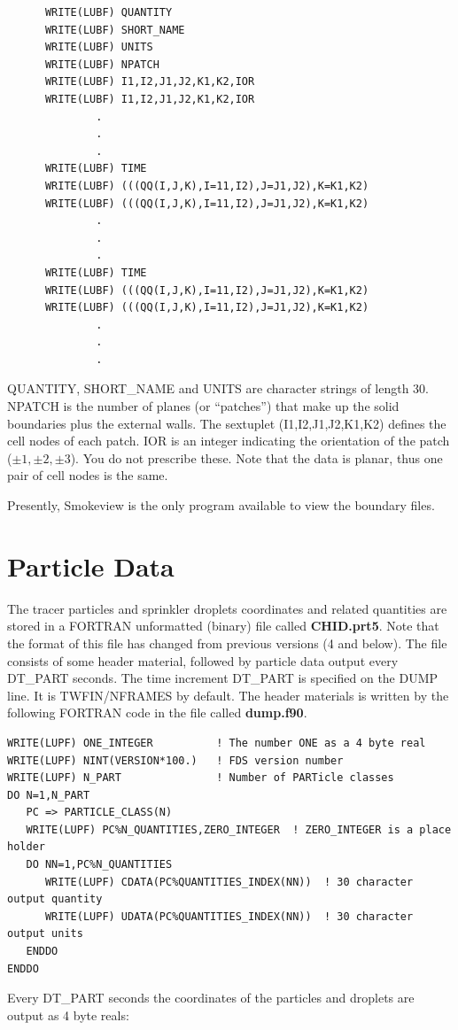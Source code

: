 \documentclass[11pt]{book}
\begin{document}
\footnotesize
\begin{verbatim}
      WRITE(LUBF) QUANTITY
      WRITE(LUBF) SHORT_NAME
      WRITE(LUBF) UNITS
      WRITE(LUBF) NPATCH
      WRITE(LUBF) I1,I2,J1,J2,K1,K2,IOR
      WRITE(LUBF) I1,I2,J1,J2,K1,K2,IOR
              .
              .
              .
      WRITE(LUBF) TIME
      WRITE(LUBF) (((QQ(I,J,K),I=11,I2),J=J1,J2),K=K1,K2)
      WRITE(LUBF) (((QQ(I,J,K),I=11,I2),J=J1,J2),K=K1,K2)
              .
              .
              .
      WRITE(LUBF) TIME
      WRITE(LUBF) (((QQ(I,J,K),I=11,I2),J=J1,J2),K=K1,K2)
      WRITE(LUBF) (((QQ(I,J,K),I=11,I2),J=J1,J2),K=K1,K2)
              .
              .
              .
\end{verbatim}
\normalsize
{\ct QUANTITY}, {\ct SHORT\_NAME} and {\ct UNITS} are
character strings of length 30.
{\ct NPATCH} is the number of planes (or ``patches'') that make up the
solid boundaries plus the external walls.
The sextuplet ({\ct I1,I2,J1,J2,K1,K2}) defines the cell nodes of each
patch. {\ct IOR} is an integer indicating the orientation of the
patch ($\pm 1,\pm 2,\pm 3$).
You do not prescribe these. Note that the data is planar,
thus one pair of cell nodes is the same.

Presently, Smokeview is the only program available to view the
boundary files.

\section{Particle Data}%
\label{out:PART}
The tracer particles and sprinkler droplets coordinates and related quantities
are stored in a FORTRAN unformatted (binary) file called {\bf CHID.prt5}.
Note that the format of this file has changed from previous versions (4 and below).
The file consists of some header material, followed by particle data output every
{\ct DT\_PART} seconds. The time increment {\ct DT\_PART} is specified on the
{\ct DUMP} line. It is {\ct TWFIN/NFRAMES} by default.
The header materials is written by the following FORTRAN code in the file called {\bf dump.f90}.

\footnotesize
\begin{verbatim}
WRITE(LUPF) ONE_INTEGER          ! The number ONE as a 4 byte real
WRITE(LUPF) NINT(VERSION*100.)   ! FDS version number
WRITE(LUPF) N_PART               ! Number of PARTicle classes
DO N=1,N_PART
   PC => PARTICLE_CLASS(N)
   WRITE(LUPF) PC%N_QUANTITIES,ZERO_INTEGER  ! ZERO_INTEGER is a place holder
   DO NN=1,PC%N_QUANTITIES
      WRITE(LUPF) CDATA(PC%QUANTITIES_INDEX(NN))  ! 30 character output quantity
      WRITE(LUPF) UDATA(PC%QUANTITIES_INDEX(NN))  ! 30 character output units
   ENDDO
ENDDO
\end{verbatim}
\normalsize
Every {\ct DT\_PART} seconds the coordinates of the particles and droplets are output as 4 byte reals:
\end{document}

